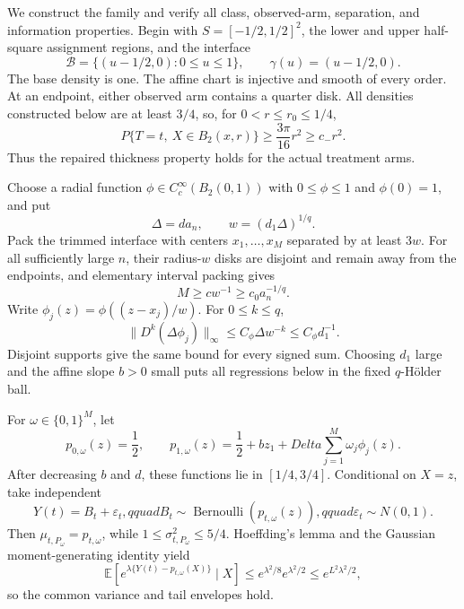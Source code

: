 We construct the family and verify all class, observed-arm, separation, and
information properties.  Begin with
\(S=[-1/2,1/2]^2\), the lower and upper half-square assignment regions, and
the interface
\[
 \mathcal B=\{(u-1/2,0):0\leq u\leq1\},
 \qquad \gamma(u)=(u-1/2,0).
\]
The base density is one.  The affine chart is injective and smooth of every
order.  At an endpoint, either observed arm contains a quarter disk.  All
densities constructed below are at least \(3/4\), so, for
\(0<r\leq r_0\leq1/4\),
\[
 P\{T=t,\ X\in B_2(x,r)\}\geq\frac{3\pi}{16}r^2
 \geq c_-r^2.
\]
Thus the repaired thickness property holds for the actual treatment arms.

Choose a radial function
\(\phi\in C_c^\infty(B_2(0,1))\) with
\(0\leq\phi\leq1\) and \(\phi(0)=1\), and put
\[
 \Delta=d a_n,\qquad w=(d_1\Delta)^{1/q}.
\]
Pack the trimmed interface with centers \(x_1,\ldots,x_M\) separated by at
least \(3w\).  For all sufficiently large \(n\), their radius-\(w\) disks are
disjoint and remain away from the endpoints, and elementary interval packing
gives
\[
 M\geq c w^{-1}\geq c_0a_n^{-1/q}.
\]
Write \(\phi_j(z)=\phi((z-x_j)/w)\).  For \(0\leq k\leq q\),
\[
 \lVert D^k(\Delta\phi_j)\rVert_\infty
 \leq C_\phi\Delta w^{-k}\leq C_\phi d_1^{-1}.
\]
Disjoint supports give the same bound for every signed sum.  Choosing
\(d_1\) large and the affine slope \(b>0\) small puts all regressions below in
the fixed \(q\)-H\"older ball.

For \(\omega\in\{0,1\}^M\), let
\[
 p_{0,\omega}(z)=\frac12,
 \qquad
 p_{1,\omega}(z)=\frac12+bz_1+Delta\sum_{j=1}^M\omega_j\phi_j(z).
\]
After decreasing \(b\) and \(d\), these functions lie in
\([1/4,3/4]\).  Conditional on \(X=z\), take independent
\[
 Y(t)=B_t+\varepsilon_t,qquad
 B_t\sim\operatorname{Bernoulli}(p_{t,\omega}(z)),qquad
 \varepsilon_t\sim N(0,1).
\]
Then \(\mu_{t,P_\omega}=p_{t,\omega}\), while
\(1\leq\sigma^2_{t,P_\omega}\leq5/4\).  Hoeffding's lemma and the Gaussian
moment-generating identity yield
\[
 \mathbb E\!\left[
 e^{\lambda\{Y(t)-p_{t,\omega}(X)\}}\mid X\right]
 \leq e^{\lambda^2/8}e^{\lambda^2/2}
 \leq e^{L^2\lambda^2/2},
\]
so the common variance and tail envelopes hold.

